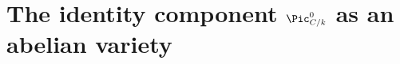 \chapter{The identity component \(\Pic^0_{C/k}\) as an abelian variety}
\label{chap:Picard_Pic0AbelianVariety}

\providecommand{\tu}{\textup}

%
%
%

